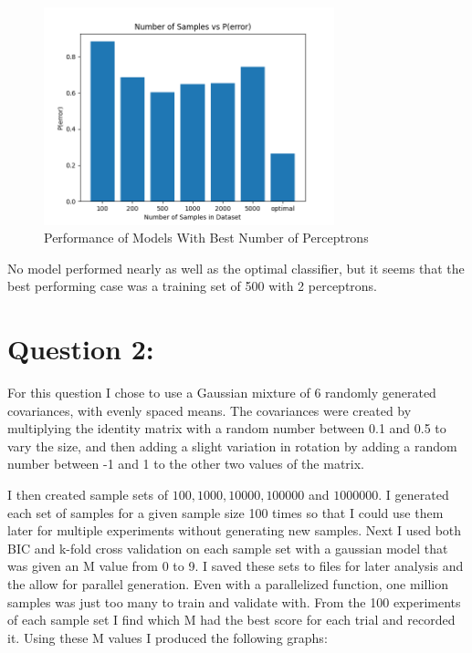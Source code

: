\documentclass[11pt]{article}
\begin{document}
\begin{figure}[H]
	\centering
	\includegraphics[width=0.75\textwidth]{samples}
	\caption{Performance of Models With Best Number of Perceptrons}
\end{figure}

No model performed nearly as well as the optimal classifier,
but it seems that the best performing case was a training set of 500 with 2 perceptrons.

\section*{Question 2:}
For this question I chose to use a Gaussian mixture of 6 randomly generated covariances, with evenly spaced means.
The covariances were created by multiplying the identity matrix with a random number between 0.1 and 0.5 to vary the size,
and then adding a slight variation in rotation by adding a random number between -1 and 1 to the other two values of the matrix.

I then created sample sets of $100, 1000, 10000, 100000$ and $1000000$.
I generated each set of samples for a given sample size 100 times so that I could use them later for multiple experiments without generating new samples.
Next I used both BIC and k-fold cross validation on each sample set with a gaussian model that was given an M value from 0 to 9.
I saved these sets to files for later analysis and the allow for parallel generation.
Even with a parallelized function, one million samples was just too many to train and validate with.
From the 100 experiments of each sample set I find which M had the best score for each trial and recorded it.
Using these M values I produced the following graphs:
\end{document}
